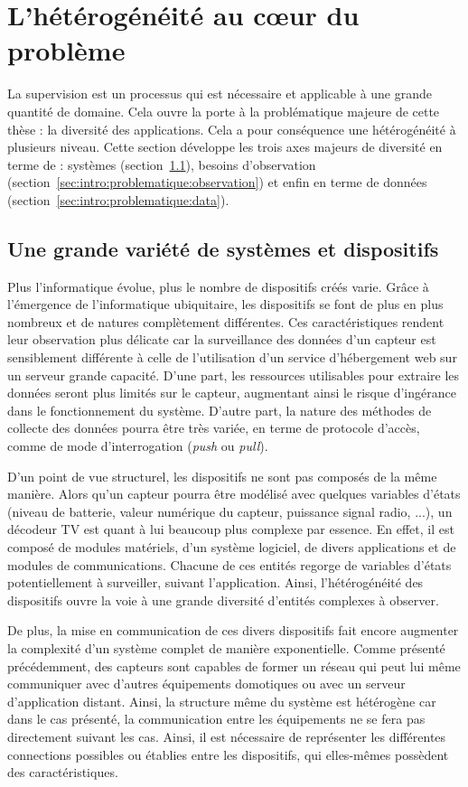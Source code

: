 \section{L'hétérogénéité au cœur du problème}\label{sec:intro:problematique}
La supervision est un processus qui est nécessaire et applicable à une grande quantité de domaine. Cela ouvre la porte à la problématique majeure de cette thèse : la diversité des applications. Cela a pour conséquence une hétérogénéité à plusieurs niveau. Cette section développe les trois axes majeurs de diversité en terme de : systèmes (section~\ref{sec:intro:problematique:devices}), besoins d'observation (section~\ref{sec:intro:problematique:observation}) et enfin en terme de données (section~\ref{sec:intro:problematique:data}).

\subsection{Une grande variété de systèmes et dispositifs}\label{sec:intro:problematique:devices}
Plus l'informatique évolue, plus le nombre de dispositifs créés varie. Grâce à l'émergence de l'informatique ubiquitaire, les dispositifs se font de plus en plus nombreux et de natures complètement différentes. Ces caractéristiques rendent leur observation plus délicate car la surveillance des données d'un capteur est sensiblement différente à celle de l'utilisation d'un service d'hébergement web sur un serveur grande capacité. D'une part, les ressources utilisables pour extraire les données seront plus limités sur le capteur, augmentant ainsi le risque d'ingérance dans le fonctionnement du système. D'autre part, la nature des méthodes de collecte des données pourra être très variée, en terme de protocole d'accès, comme de mode d'interrogation (\textit{push} ou \textit{pull}).

D'un point de vue structurel, les dispositifs ne sont pas composés de la même manière. Alors qu'un capteur pourra être modélisé avec quelques variables d'états (niveau de batterie, valeur numérique du capteur, puissance signal radio, ...), un décodeur TV est quant à lui beaucoup plus complexe par essence. En effet, il est composé de modules matériels, d'un système logiciel, de divers applications et de modules de communications. Chacune de ces entités regorge de variables d'états potentiellement à surveiller, suivant l'application. Ainsi, l'hétérogénéité des dispositifs ouvre la voie à une grande diversité d'entités complexes à observer.

De plus, la mise en communication de ces divers dispositifs fait encore augmenter la complexité d'un système complet de manière exponentielle. Comme présenté précédemment, des capteurs sont capables de former un réseau qui peut lui même communiquer avec d'autres équipements domotiques ou avec un serveur d'application distant. Ainsi, la structure même du système est hétérogène car dans le cas présenté, la communication entre les équipements ne se fera pas directement suivant les cas. Ainsi, il est nécessaire de représenter les différentes connections possibles ou établies entre les dispositifs, qui elles-mêmes possèdent des caractéristiques. 

